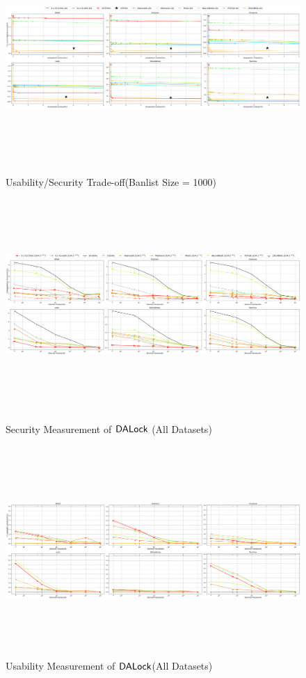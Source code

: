 	\begin{figure}
		\includegraphics[width=\linewidth, height = 8cm]{Figures/Experiments/B1000.png}
		\vspace{-0.2in}
		\caption[Usability/Security Trade-off]{Usability/Security Trade-off(Banlist Size = 1000)}
		\label{fig:secuseB1000}
		\includegraphics[width=\linewidth, height = 8cm]{Figures/Experiments/Attacker/SecurityBigPictureFull}
		\vspace{-0.2in}
		\caption{Security Measurement of $\mathsf{DALock}$ (All Datasets)}
		\label{fig:securitydpcomparefull}	
		\includegraphics[width=\linewidth, height = 8cm]{Figures/Experiments/Utility/UsabilityBigPictureFull}
		\vspace{-0.2in}
		\caption{Usability Measurement of $\mathsf{DALock}$(All Datasets)}
		\label{fig:usabilitydpcomparefull}	
	\end{figure}
	



